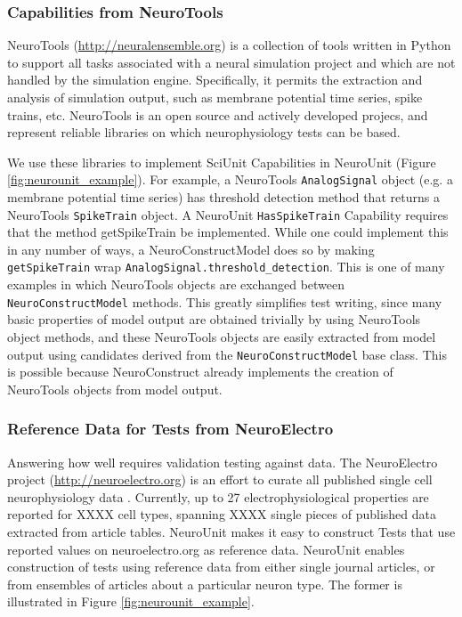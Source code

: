 \documentclass[11pt,letterpaper]{article}
\begin{document}
\subsubsection{Capabilities from NeuroTools}
NeuroTools (\url{http://neuralensemble.org}) is a collection of tools written in Python to support all tasks associated with a neural simulation project and which are not handled by the simulation engine.  Specifically, it permits the extraction and analysis of simulation output, such as membrane potential time series, spike trains, etc. NeuroTools is an open source and actively developed projecs, and represent reliable libraries on which neurophysiology tests can be based. 

We use these libraries to implement SciUnit Capabilities in NeuroUnit (Figure \ref{fig:neurounit_example}).  For example, a NeuroTools \verb|AnalogSignal| object (e.g. a membrane potential time series) has threshold detection method that returns a NeuroTools \verb|SpikeTrain| object.  A NeuroUnit \verb|HasSpikeTrain| Capability requires that the method getSpikeTrain be implemented.  While one could implement this in any number of ways, a NeuroConstructModel does so by making \verb|getSpikeTrain| wrap \verb|AnalogSignal.threshold_detection|.  This is one of many examples in which NeuroTools objects are exchanged between \verb|NeuroConstructModel| methods.  This greatly simplifies test writing, since many basic properties of model output are obtained trivially by using NeuroTools object methods, and these NeuroTools objects are easily extracted from model output using candidates derived from the \verb|NeuroConstructModel| base class.  This is possible because NeuroConstruct already implements the creation of NeuroTools objects from model output.  

\subsubsection{Reference Data for Tests from NeuroElectro}
Answering how well requires validation testing against data. The NeuroElectro project (\url{http://neuroelectro.org}) is an effort to curate all published single cell neurophysiology data \cite{tripathy2012}.  Currently, up to 27 electrophysiological properties are reported for XXXX cell types, spanning XXXX single pieces of published data extracted from article tables.  NeuroUnit makes it easy to construct Tests that use reported values on neuroelectro.org as reference data.  NeuroUnit enables construction of tests using reference data from either single journal articles, or from ensembles of articles about a particular neuron type.  The former is illustrated in Figure \ref{fig:neurounit_example}.  
\end{document}
